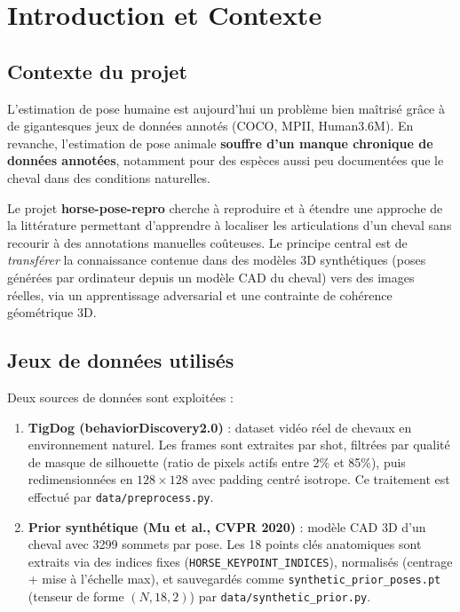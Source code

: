\documentclass[12pt,a4paper]{article}
\begin{document}
\newpage
\tableofcontents
\newpage

\section{Introduction et Contexte}

\subsection{Contexte du projet}

L'estimation de pose humaine est aujourd'hui un problème bien maîtrisé grâce à de
gigantesques jeux de données annotés (COCO, MPII, Human3.6M). En revanche, l'estimation
de pose animale \textbf{souffre d'un manque chronique de données annotées}, notamment
pour des espèces aussi peu documentées que le cheval dans des conditions naturelles.

Le projet \textbf{horse-pose-repro} cherche à reproduire et à étendre une approche
de la littérature permettant d'apprendre à localiser les articulations d'un cheval
sans recourir à des annotations manuelles coûteuses. Le principe central est de
\emph{transférer} la connaissance contenue dans des modèles 3D synthétiques (poses
générées par ordinateur depuis un modèle CAD du cheval) vers des images réelles,
via un apprentissage adversarial et une contrainte de cohérence géométrique 3D.

\subsection{Jeux de données utilisés}

Deux sources de données sont exploitées :

\begin{enumerate}
  \item \textbf{TigDog (behaviorDiscovery2.0)} : dataset vidéo réel de chevaux en
  environnement naturel. Les frames sont extraites par shot, filtrées par qualité
  de masque de silhouette (ratio de pixels actifs entre 2\% et 85\%), puis
  redimensionnées en $128\times128$ avec padding centré isotrope. Ce traitement
  est effectué par \texttt{data/preprocess.py}.

  \item \textbf{Prior synthétique (Mu et al., CVPR 2020)} : modèle CAD 3D d'un
  cheval avec 3299 sommets par pose. Les 18 points clés anatomiques sont extraits
  via des indices fixes (\texttt{HORSE\_KEYPOINT\_INDICES}), normalisés
  (centrage + mise à l'échelle max), et sauvegardés comme \texttt{synthetic\_prior\_poses.pt}
  (tenseur de forme $(N, 18, 2)$) par \texttt{data/synthetic\_prior.py}.
\end{enumerate}
\end{document}
